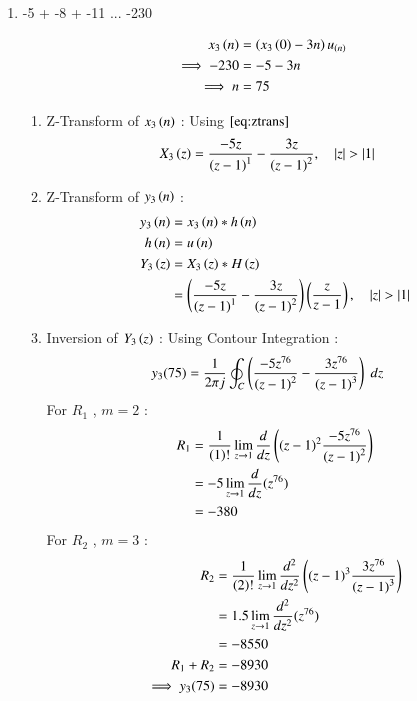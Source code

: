 \documentclass[journal,12pt,onecolumn]{IEEEtran}
\theoremstyle{remark}
\begin{document}
\begin{enumerate}
 
\item
-5 + -8 + -11 ... -230


\begin{align}
x_3\left(n\right) &= \left(x_3\left(0\right) -3n\right)u_{\left(n\right)}\\
\implies -230 &= -5 -3n \\
\implies n &= 75
\end{align}
\begin{enumerate}
\item
Z-Transform of $x_3\left(n\right)$ :
Using $\eqref{eq:ztrans}$
\begin{align}
X_3\left(z\right) &=  \frac{-5z}{\left(z-1\right)^{1}} -
       \frac{3z}{\left(z-1\right)^{2}} \label{eq:ee25-8}
,\quad \left\vert z\right\vert>\left\vert1\right\vert 
\end{align}

    
\item
Z-Transform of $y_3\left(n\right)$ :
\begin{align}
    y_3\left(n\right) &= x_3\left(n\right) * h\left(n\right) \\
         h\left(n\right) &= u\left(n\right) \\
    Y_3\left(z\right) &= X_3\left(z\right) * H\left(z\right)\\
             &= \left(\frac{-5z}{{\left(z-1\right)^1}}-
       \frac{3z}{\left(z-1\right)^2}\right)\left(\frac{z}{z-1}\right)
,\quad \left\vert z\right\vert>\left\vert1\right\vert 
    \end{align}

    \item
Inversion of $Y_3\left(z\right)$ :
Using Contour Integration :
\begin{align}
    y_3{(75)}&=\frac{1}{2\pi j}\oint_{C}\left(\frac{-5z^{76}}{\left(z-1\right)^2}-
       \frac{3z^{76}}{\left(z-1\right)^3}\right) \;dz 
\end{align}
For $R_1$ , $m=2$ :
\begin{align}
    R_1 &=\frac{1}{\left(1\right)!}\lim\limits_{z\to 1}\frac{d}{dz}\left({(z-1)}^{2}\frac{-5z^{76}}{{(z-1)}^2}\right)   \\
    &=-5\lim\limits_{z\to 1}\frac{d}{dz}(z^{76})   \\
    &= -380
        \end{align}
  For $R_2$ , $m=3$ :
    \begin{align}
    R_2 &=\frac{1}{\left(2\right)!}\lim\limits_{z\to 1}\frac{d^{2}}{dz^{2}}\left({(z-1)}^{3}\frac{3z^{76}}{{(z-1)}^3}\right)   \\
    &=1.5\lim\limits_{z\to 1}\frac{d^2}{dz^2}(z^{76})   \\
    &= -8550\\
    R_1 + R_2 &= -8930\\
    \implies  y_3{(75)} &= -8930
\end{align}
    \end{enumerate}




\end{enumerate}
\end{document}
